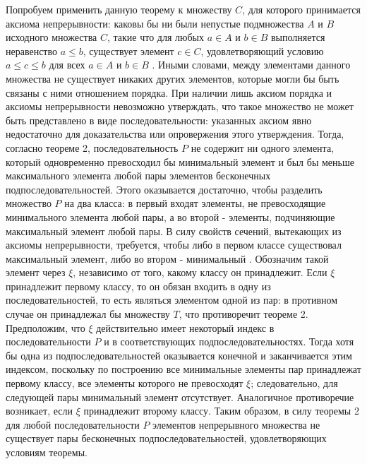 \documentclass[12pt]{article}
\begin{document}
Попробуем применить данную теорему к множеству $C$, для которого принимается аксиома непрерывности: каковы бы ни были непустые подмножества $A$ и $B$ исходного множества $C$, такие что для любых $a \in A$ и $b \in B$ выполняется неравенство $a \leq b$, существует элемент $c \in C$, удовлетворяющий условию $a \leq c \leq b$ для всех $a \in A$ и $b \in B$ \cite{matan-completeness}. Иными словами, между элементами данного множества не существует никаких других элементов, которые могли бы быть связаны с ними отношением порядка. При наличии лишь аксиом порядка и аксиомы непрерывности невозможно утверждать, что такое множество не может быть представлено в виде последовательности: указанных аксиом явно недостаточно для доказательства или опровержения этого утверждения. Тогда, согласно теореме 2, последовательность $P$ не содержит ни одного элемента, который одновременно превосходил бы минимальный элемент и был бы меньше максимального элемента любой пары элементов бесконечных подпоследовательностей. Этого оказывается достаточно, чтобы разделить множество $P$ на два класса: в первый входят элементы, не превосходящие минимального элемента любой пары, а во второй - элементы, подчиняющие максимальный элемент любой пары. В силу свойств сечений, вытекающих из аксиомы непрерывности, требуется, чтобы либо в первом классе существовал максимальный элемент, либо во втором - минимальный \cite{matan-cut}. Обозначим такой элемент через $\xi$, независимо от того, какому классу он принадлежит. Если $\xi$ принадлежит первому классу, то он обязан входить в одну из последовательностей, то есть являться элементом одной из пар: в противном случае он принадлежал бы множеству $T$, что противоречит теореме 2. Предположим, что $\xi$ действительно имеет некоторый индекс в последовательности $P$ и в соответствующих подпоследовательностях. Тогда хотя бы одна из подпоследовательностей оказывается конечной и заканчивается этим индексом, поскольку по построению все минимальные элементы пар принадлежат первому классу, все элементы которого не превосходят $\xi$; следовательно, для следующей пары минимальный элемент отсутствует. Аналогичное противоречие возникает, если $\xi$ принадлежит второму классу. Таким образом, в силу теоремы 2 для любой последовательности $P$ элементов непрерывного множества не существует пары бесконечных подпоследовательностей, удовлетворяющих условиям теоремы.
\end{document}
